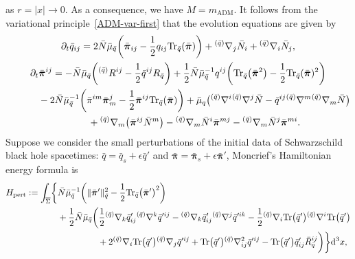 \documentclass[pdftex]{sigma}
\def\eps{\epsilon}%
\def\ptl{\partial}%
\def\mbo#1{\boldsymbol{#1}}%
\def\olin#1{\overline{#1}{}}%
\def\grad{{\nabla}}%
\newcommand{\leftexp}[2]{{\vphantom{#2}}^{#1}{#2}}
\def\halb{\frac{1}{2}}%
\numberwithin{equation}{section}
\begin{document}
as $ r= \vert x \vert \to 0$. As a consequence, we have $M =m_{\text{ADM}}$.
It follows from the variational principle~\eqref{ADM-var-first} that the evolution equations are given by
\begin{gather*}
 \ptl_t \bar{q}_{ij} = 2 \bar{N} \bar{\mu}_{\bar{q}} \biggl(\bar{\mbo{\pi}}_{ij} - \halb q_{ij} {\rm Tr}_{\bar{q}}(\bar{\mbo{\pi}}) \biggr) + \leftexp{(\bar{q})}{\grad}_j \bar{N}_i+ \leftexp{(\bar{q})}{\grad}_i \bar{N}_j, \\
\ptl_t \bar{\mbo{\pi}}^{ij} = - \bar{N} \bar{\mu}_{\bar{q}} \biggl(\leftexp{(\bar{q})}{R}^{ij} - \halb \bar{q}^{ij} R_{\bar{q}} \biggr) + \halb \bar{N} \bar{\mu}^{-1}_{\bar{q}} q^{ij} \biggl({\rm Tr}_{\bar{q}} \bigl(\bar{\mbo{\pi}}^2\bigr) - \halb {\rm Tr}_{\bar{q}}(\bar{\mbo{\pi}})^2 \biggr)
\\ \hphantom{\ptl_t \bar{\mbo{\pi}}^{ij} =}{}
 -2 \bar{N} \bar{\mu}^{-1}_{\bar{q}} \biggl(\bar{\pi}^{im} \bar{\mbo{\pi}}^j_m - \halb \bar{\mbo{\pi}}^{ij} {\rm Tr}_{\bar{q}}(\bar{\mbo{\pi}})\biggr) + \bar{\mu}_q \bigl( \leftexp{(\bar{q})}{\grad}^
i \leftexp{(\bar{q})}{\grad}^
j \bar{N} - \bar{q}^{ij} \leftexp{(\bar{q})}{\grad}
^m \leftexp{(\bar{q})}{\grad}_m \bar{N}\bigr)
\\ \hphantom{\ptl_t \bar{\mbo{\pi}}^{ij} =}{}
+ \leftexp{(\bar{q})}{\grad}_m \bigl(\bar{\mbo{\pi}}^{ij} \bar{N} ^m\bigr) - \leftexp{(\bar{q})}{\grad}_m \bar{N}^i \bar{\mbo{\pi}}^{mj}
- \leftexp{(\bar{q})}{\grad}_m \bar{N}^j \bar{\mbo{\pi}}^{mi}.
\end{gather*}
Suppose we consider the small perturbations of the initial data of Schwarzschild black hole spacetimes: $\bar{q}= \bar{q}_{s} + \eps \bar{q}'$ and $\bar{\mbo{\pi}}= \bar{\mbo{\pi}}_s + \eps \bar{\mbo{\pi}}'$, Moncrief's Hamiltonian energy formula is
\begin{align}\label{vm-74}
H_{\text{pert}} := \int_{\olin{\Sigma}} \biggl\{& \bar{N} \bar{\mu}^{-1}_{\bar{q}} \biggl(\Vert \bar{\mbo{\pi}}' \Vert_{\bar{q}}^2 - \halb {\rm Tr}_{\bar{q}}\bigl(\bar{\mbo{\pi}}'\bigr)^2 \biggr)\\
& {} + \halb \bar{N} \bar{\mu}_{\bar{q}} \biggl(\halb \leftexp{(\bar{q})}{\grad}_k \bar{q}'_{ij} \leftexp{(\bar{q})}{\grad}^k \bar{q}'^{ij}- \leftexp{(\bar{q})}{\grad}_k \bar{q}'_{ij} \leftexp{(\bar{q})}{\grad}^j \bar{q}'^{ik}
- \halb \leftexp{(\bar{q})}{\grad}_i {\rm Tr} \bigl(\bar{q}'\bigr) \leftexp{(\bar{q})}{\grad}^i {\rm Tr} \bigl(\bar{q}'\bigr)
\notag\\
&\hphantom{+ \halb \bar{N} \bar{\mu}_{\bar{q}} \biggl(}{}\ + 2\leftexp{(\bar{q})}{\grad}_i {\rm Tr}\bigl(\bar{q}'\bigr) \leftexp{(\bar{q})}{\grad}_j \bar{q}'^{ij} + {\rm Tr} \bigl(\bar{q}'\bigr) \leftexp{(\bar{q})}{\grad}^2_{ij} \bar{q}'^{ij} - {\rm Tr} \bigl(\bar{q}'\bigr) \bar{q}'_{ij} \bar{R}^{ij}_{\bar{q}} \biggr) \biggr\} {\rm d}^3x,\notag
\end{align}
\end{document}
